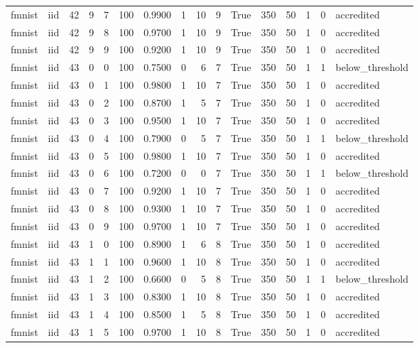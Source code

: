 \begin{tabular}{llrrrrrrrrrrrrrl}
fmnist & iid & 42 & 9 & 7 & 100 & 0.9900 & 1 & 10 & 9 & True & 350 & 50 & 1 & 0 & accredited \\
fmnist & iid & 42 & 9 & 8 & 100 & 0.9700 & 1 & 10 & 9 & True & 350 & 50 & 1 & 0 & accredited \\
fmnist & iid & 42 & 9 & 9 & 100 & 0.9200 & 1 & 10 & 9 & True & 350 & 50 & 1 & 0 & accredited \\
fmnist & iid & 43 & 0 & 0 & 100 & 0.7500 & 0 & 6 & 7 & True & 350 & 50 & 1 & 1 & below\_threshold \\
fmnist & iid & 43 & 0 & 1 & 100 & 0.9800 & 1 & 10 & 7 & True & 350 & 50 & 1 & 0 & accredited \\
fmnist & iid & 43 & 0 & 2 & 100 & 0.8700 & 1 & 5 & 7 & True & 350 & 50 & 1 & 0 & accredited \\
fmnist & iid & 43 & 0 & 3 & 100 & 0.9500 & 1 & 10 & 7 & True & 350 & 50 & 1 & 0 & accredited \\
fmnist & iid & 43 & 0 & 4 & 100 & 0.7900 & 0 & 5 & 7 & True & 350 & 50 & 1 & 1 & below\_threshold \\
fmnist & iid & 43 & 0 & 5 & 100 & 0.9800 & 1 & 10 & 7 & True & 350 & 50 & 1 & 0 & accredited \\
fmnist & iid & 43 & 0 & 6 & 100 & 0.7200 & 0 & 0 & 7 & True & 350 & 50 & 1 & 1 & below\_threshold \\
fmnist & iid & 43 & 0 & 7 & 100 & 0.9200 & 1 & 10 & 7 & True & 350 & 50 & 1 & 0 & accredited \\
fmnist & iid & 43 & 0 & 8 & 100 & 0.9300 & 1 & 10 & 7 & True & 350 & 50 & 1 & 0 & accredited \\
fmnist & iid & 43 & 0 & 9 & 100 & 0.9700 & 1 & 10 & 7 & True & 350 & 50 & 1 & 0 & accredited \\
fmnist & iid & 43 & 1 & 0 & 100 & 0.8900 & 1 & 6 & 8 & True & 350 & 50 & 1 & 0 & accredited \\
fmnist & iid & 43 & 1 & 1 & 100 & 0.9600 & 1 & 10 & 8 & True & 350 & 50 & 1 & 0 & accredited \\
fmnist & iid & 43 & 1 & 2 & 100 & 0.6600 & 0 & 5 & 8 & True & 350 & 50 & 1 & 1 & below\_threshold \\
fmnist & iid & 43 & 1 & 3 & 100 & 0.8300 & 1 & 10 & 8 & True & 350 & 50 & 1 & 0 & accredited \\
fmnist & iid & 43 & 1 & 4 & 100 & 0.8500 & 1 & 5 & 8 & True & 350 & 50 & 1 & 0 & accredited \\
fmnist & iid & 43 & 1 & 5 & 100 & 0.9700 & 1 & 10 & 8 & True & 350 & 50 & 1 & 0 & accredited \\

\end{tabular}
